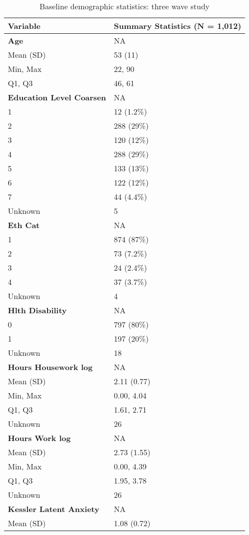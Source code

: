 \documentclass[
  single column]{article}
\begin{document}
\begin{longtable}[]{@{}ll@{}}

\caption{\label{tbl-table-demography-code}Baseline demographic
statistics: three wave study}

\tabularnewline

\toprule\noalign{}
Variable & Summary Statistics (N = 1,012) \\
\midrule\noalign{}
\endhead
\bottomrule\noalign{}
\endlastfoot
\textbf{Age} & NA \\
Mean (SD) & 53 (11) \\
Min, Max & 22, 90 \\
Q1, Q3 & 46, 61 \\
\textbf{Education Level Coarsen} & NA \\
1 & 12 (1.2\%) \\
2 & 288 (29\%) \\
3 & 120 (12\%) \\
4 & 288 (29\%) \\
5 & 133 (13\%) \\
6 & 122 (12\%) \\
7 & 44 (4.4\%) \\
Unknown & 5 \\
\textbf{Eth Cat} & NA \\
1 & 874 (87\%) \\
2 & 73 (7.2\%) \\
3 & 24 (2.4\%) \\
4 & 37 (3.7\%) \\
Unknown & 4 \\
\textbf{Hlth Disability} & NA \\
0 & 797 (80\%) \\
1 & 197 (20\%) \\
Unknown & 18 \\
\textbf{Hours Housework log} & NA \\
Mean (SD) & 2.11 (0.77) \\
Min, Max & 0.00, 4.04 \\
Q1, Q3 & 1.61, 2.71 \\
Unknown & 26 \\
\textbf{Hours Work log} & NA \\
Mean (SD) & 2.73 (1.55) \\
Min, Max & 0.00, 4.39 \\
Q1, Q3 & 1.95, 3.78 \\
Unknown & 26 \\
\textbf{Kessler Latent Anxiety} & NA \\
Mean (SD) & 1.08 (0.72) \\

\end{longtable}
\end{document}
